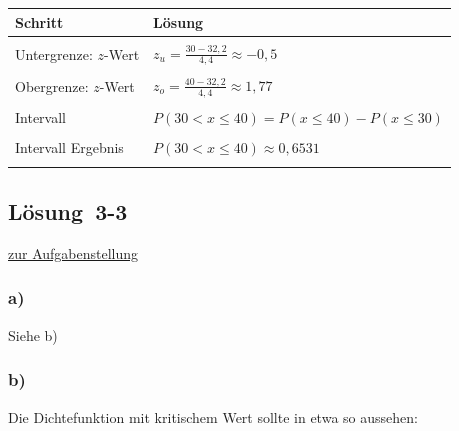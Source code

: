 \documentclass[
  11pt,
  ngerman,
  a4paper,
]{report}
\begin{document}
\begin{table}[H]
\centering
\begin{tabular}{>{\raggedright\arraybackslash}p{8cm}>{\raggedright\arraybackslash}p{8cm}}
\toprule
\textbf{Schritt} & \textbf{Lösung}\\
\midrule
\cellcolor{gray!6}{Formel} & \cellcolor{gray!6}{$z_{i} = \frac{x_{i} - \mu}{\sigma}$}\\
Untergrenze: $z$-Wert & $z_{u}=\frac{30-32{,}2}{4{,}4}\approx-0{,}5$\\
\cellcolor{gray!6}{Untergrenze: Unterschr.} & \cellcolor{gray!6}{$p \approx 0{,}3085$}\\
Obergrenze: $z$-Wert & $z_{o}=\frac{40-32{,}2}{4{,}4}\approx1{,}77$\\
\cellcolor{gray!6}{Obergrenze: Unterschr.} & \cellcolor{gray!6}{$p \approx 0{,}9616$}\\
Intervall & $P(30 < x \leq 40) = P(x \leq 40) - P(x \leq 30)$\\
\cellcolor{gray!6}{Intervall einsetzen} & \cellcolor{gray!6}{$P(30 < x \leq 40) \approx P(z \leq 0{,}9616) - P(z \leq 0{,}3085)$}\\
Intervall Ergebnis & $P(30 < x \leq 40) \approx 0{,}6531$\\
\cellcolor{gray!6}{Antwortsatz} & \cellcolor{gray!6}{Ein zufälliger Wert der Verteilung liegt mit 65,31-prozentiger Wahrscheinlichkeit zwischen 30 und 40.}\\
\bottomrule
\end{tabular}
\end{table}

\hypertarget{loesung-3-3}{%
\subsection{Lösung~3-3}\label{loesung-3-3}}

\protect\hyperlink{aufgabe-3-3}{zur Aufgabenstellung}

\hypertarget{a-10}{%
\subsubsection{a)}\label{a-10}}

Siehe b)

\hypertarget{b-10}{%
\subsubsection{b)}\label{b-10}}

Die Dichtefunktion mit kritischem Wert sollte in etwa so aussehen:
\end{document}
